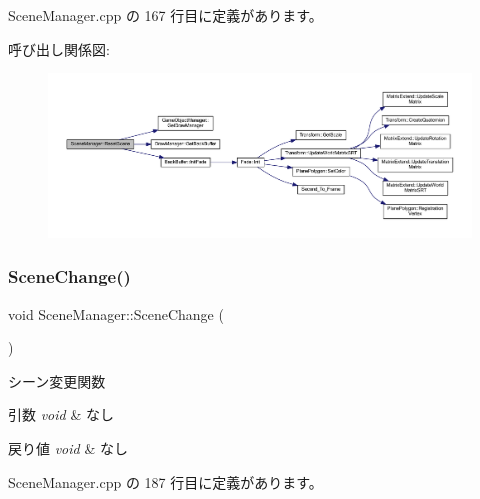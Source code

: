  Scene\+Manager.\+cpp の 167 行目に定義があります。

呼び出し関係図\+:
\nopagebreak
\begin{figure}[H]
\begin{center}
\leavevmode
\includegraphics[width=350pt]{class_scene_manager_a1759161a38025ec8212dc98439fd7335_cgraph}
\end{center}
\end{figure}
\mbox{\label{class_scene_manager_ab1ffc5d84cf812e4105cba755d034770}} 
\subsubsection{\texorpdfstring{Scene\+Change()}{SceneChange()}}
{\footnotesize\ttfamily void Scene\+Manager\+::\+Scene\+Change (\begin{DoxyParamCaption}{ }\end{DoxyParamCaption})\hspace{0.3cm}{\ttfamily [private]}}



シーン変更関数 


\begin{DoxyParams}{引数}
{\em void} & なし \\
\hline
\end{DoxyParams}

\begin{DoxyRetVals}{戻り値}
{\em void} & なし \\
\hline
\end{DoxyRetVals}


 Scene\+Manager.\+cpp の 187 行目に定義があります。

